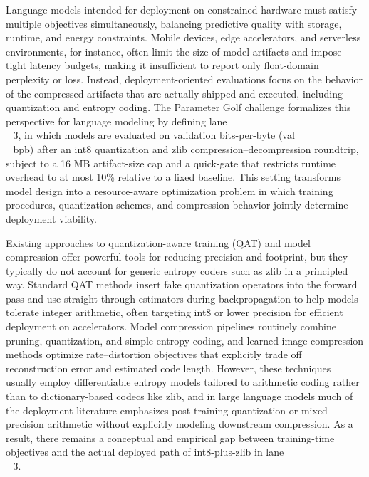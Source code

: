 \documentclass{article}
\begin{document}
Language models intended for deployment on constrained hardware must satisfy multiple objectives simultaneously, balancing predictive quality with storage, runtime, and energy constraints. Mobile devices, edge accelerators, and serverless environments, for instance, often limit the size of model artifacts and impose tight latency budgets, making it insufficient to report only float-domain perplexity or loss. Instead, deployment-oriented evaluations focus on the behavior of the compressed artifacts that are actually shipped and executed, including quantization and entropy coding. The Parameter Golf challenge formalizes this perspective for language modeling by defining lane\\_3, in which models are evaluated on validation bits-per-byte (val\\_bpb) after an int8 quantization and zlib compression--decompression roundtrip, subject to a 16 MB artifact-size cap and a quick-gate that restricts runtime overhead to at most 10\% relative to a fixed baseline. This setting transforms model design into a resource-aware optimization problem in which training procedures, quantization schemes, and compression behavior jointly determine deployment viability.

Existing approaches to quantization-aware training (QAT) and model compression offer powerful tools for reducing precision and footprint, but they typically do not account for generic entropy coders such as zlib in a principled way. Standard QAT methods insert fake quantization operators into the forward pass and use straight-through estimators during backpropagation to help models tolerate integer arithmetic, often targeting int8 or lower precision for efficient deployment on accelerators. Model compression pipelines routinely combine pruning, quantization, and simple entropy coding, and learned image compression methods optimize rate--distortion objectives that explicitly trade off reconstruction error and estimated code length. However, these techniques usually employ differentiable entropy models tailored to arithmetic coding rather than to dictionary-based codecs like zlib, and in large language models much of the deployment literature emphasizes post-training quantization or mixed-precision arithmetic without explicitly modeling downstream compression. As a result, there remains a conceptual and empirical gap between training-time objectives and the actual deployed path of int8-plus-zlib in lane\\_3.
\end{document}
